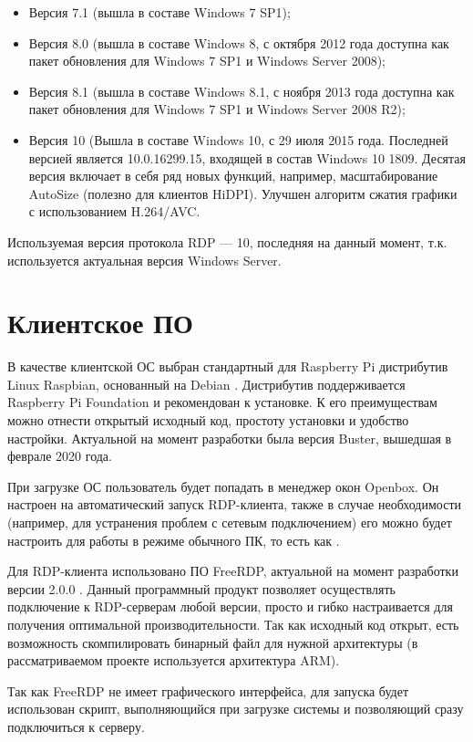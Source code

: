 \begin{itemize}
    \item Версия 7.1 (вышла в составе Windows 7 SP1);
    \item Версия 8.0 (вышла в составе Windows 8, с октября 2012 года доступна как пакет
        обновления для Windows 7 SP1 и Windows Server 2008);
    \item Версия 8.1 (вышла в составе Windows 8.1, с ноября 2013 года доступна как пакет
        обновления для Windows 7 SP1 и Windows Server 2008 R2);
    \item Версия 10 (Вышла в составе Windows 10, с 29 июля 2015 года. Последней версией
        является 10.0.16299.15, входящей в состав Windows 10 1809. Десятая версия
        включает в себя ряд новых функций, например, масштабирование AutoSize (полезно
        для клиентов HiDPI). Улучшен алгоритм сжатия графики с использованием H.264/AVC.
\end{itemize}

Используемая версия протокола RDP — 10, последняя на данный момент, т.к. используется
актуальная версия Windows Server.

\section{Клиентское ПО}

В качестве клиентской ОС выбран стандартный для Raspberry Pi дистрибутив Linux Raspbian,
основанный на Debian \cite{ref:raspbian}.
Дистрибутив поддерживается Raspberry Pi Foundation и рекомендован к установке.
К его преимуществам можно отнести открытый исходный код, простоту установки и удобство 
настройки. 
Актуальной на момент разработки была версия Buster, вышедшая в феврале 2020 года.

При загрузке ОС пользователь будет попадать в менеджер окон Openbox. Он настроен на
автоматический запуск RDP-клиента, также в случае необходимости (например, для
устранения проблем с сетевым подключением) его можно будет настроить для работы в режиме
обычного ПК, то есть как .

Для RDP-клиента использовано ПО FreeRDP, актуальной на момент разработки версии 2.0.0
\cite{ref:freerdp}. Данный программный продукт позволяет осуществлять подключение к
RDP-серверам любой версии, просто и гибко настраивается для получения оптимальной
производительности.  Так как исходный код открыт, есть возможность скомпилировать
бинарный файл для нужной архитектуры (в рассматриваемом проекте используется архитектура
ARM).

Так как FreeRDP не имеет графического интерфейса, для запуска будет использован скрипт,
выполняющийся при загрузке системы и позволяющий сразу подключиться к серверу. 

